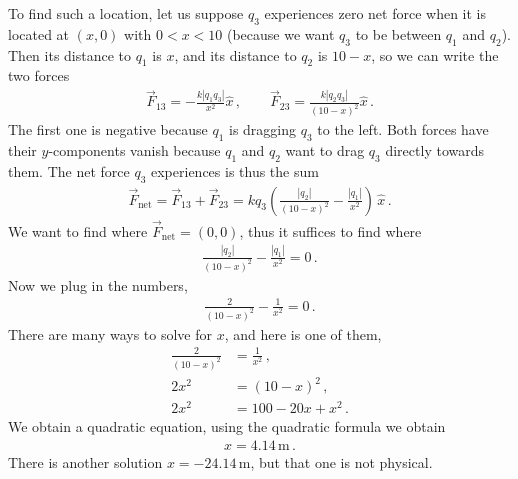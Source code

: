 \documentclass[11pt]{article}
\begin{document}
To find such a location, let us suppose $q_3$ experiences zero net force when it is located at $(x,0)$ with $0< x< 10$ (because we want $q_3$ to be between $q_1$ and $q_2$). Then its distance to $q_1$ is $x$, and its distance to $q_2$ is $10-x$, so we can write the two forces
\begin{align*}
\vec{F}_{13} = -\frac{k|q_1 q_3|}{x^2}\hat{x}\,,\qquad
\vec{F}_{23} = \frac{k|q_2 q_3|}{(10-x)^2}\hat{x}\,.
\end{align*}
The first one is negative because $q_1$ is dragging $q_3$ to the left. Both forces have their $y$-components vanish because $q_1$ and $q_2$ want to drag $q_3$ directly towards them. The net force $q_3$ experiences is thus the sum
\begin{align*}
\vec{F}_{\text{net}} = \vec{F}_{13} + \vec{F}_{23} = kq_3 \left(\frac{|q_2|}{(10-x)^2} -\frac{|q_1|}{x^2}\right)\,\hat{x} \,.
\end{align*}
We want to find where $\vec{F}_{\text{net}} = (0,0)$, thus it suffices to find where
\begin{align*}
\frac{|q_2|}{(10-x)^2} - \frac{|q_1|}{x^2} = 0\,.
\end{align*}
Now we plug in the numbers, 
\begin{align*}
\frac{2}{(10-x)^2} - \frac{1}{x^2} = 0\,.
\end{align*}
There are many ways to solve for $x$, and here is one of them, 
\begin{align*}
\frac{2}{(10-x)^2} &= \frac{1}{x^2} \,,\\
2x^2 &= (10-x)^2\,,\\
2x^2 &= 100 - 20x + x^2 \,.
\end{align*}
We obtain a quadratic equation, using the quadratic formula we obtain 
\begin{align*}
x = 4.14\,\text{m}\,.
\end{align*}
There is another solution $x = -24.14$\,m, but that one is not physical.\\
\end{document}
